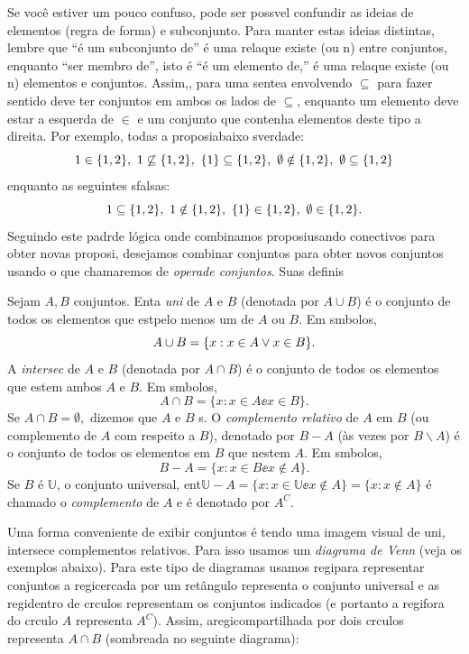 Se voc\^e estiver um pouco confuso, pode ser poss\ih vel confundir as ideias de elementos (regra de forma\caoi) e subconjunto. Para manter estas ideias distintas, lembre que ``\'e um subconjunto de'' \'e uma rela\cao que existe (ou n\aoi) entre conjuntos, enquanto ``ser membro de'', isto \'e ``\'e um elemento de,'' \'e uma rela\cao que existe (ou n\aoi) elementos e conjuntos. Assim,, para uma sente\cc a envolvendo $\subseteq$ para fazer sentido deve ter conjuntos em ambos os lados de $\subseteq$, enquanto um elemento deve estar a esquerda de $\in$ e um conjunto que contenha elementos deste tipo a direita. Por exemplo, todas a proposi\coes abaixo s\ao verdade:
\[
1\in\{1,2\},\textrm{ } 1\not\subseteq\{1,2\},\textrm{ } \{1\}\subseteq\{1,2\},\textrm{ } \emptyset\notin\{1,2\},\textrm{ } \emptyset\subseteq\{1,2\}  
\]  
enquanto as seguintes s\ao falsas:
\[
1\subseteq\{1,2\},\textrm{ } 1\notin\{1,2\},\textrm{ } \{1\}\in\{1,2\},\textrm{ } \emptyset\in \{1,2\}.
\]
Seguindo este padr\ao de l\'ogica onde combinamos proposi\coes usando conectivos para obter novas proposi\cois, desejamos combinar conjuntos para obter novos conjuntos usando o que chamaremos de {\it opera\coes de conjuntos}. Suas defini\coes s\ao

\begin{definb}
Sejam $A,B$ conjuntos. Ent\ao a {\it uni\ao} de $A$ e $B$ (denotada por $A\cup B$) \'e o conjunto de todos os elementos que est\ao pelo menos um de $A$ ou $B$. Em s\ih mbolos, 
\[
A \cup B = \{x:x\in A \vee x\in B\}. 
\]
A {\it intersec\cao} de $A$ e $B$ (denotada por $A\cap B$) \'e o conjunto de todos os elementos que est\ao em ambos $A$ e $B$. Em s\ih mbolos, 
\[
A \cap B = \{x:x\in A \ee x\in B\}. 
\]
Se $A\cap B=\emptyset,$ dizemos que $A$ e $B$ s. O {\it complemento relativo} de $A$ em $B$ (ou complemento de $A$ com respeito a $B$), denotado por $B-A$ (\`as vezes por $B \backslash A$) \'e o conjunto de todos os elementos em $B$ que n\ao est\ao em $A$. Em s\ih mbolos,
\[
B-A = \{x:x\in B \ee x\notin A\}. 
\]
Se $B$ \'e $\mathbb{U}$, o conjunto universal, ent\ao $\mathbb{U}-A = \{x:x\in \mathbb{U} \ee x\notin A\}=\{x:x\notin A\}$ \'e chamado o {\it complemento} de $A$ e \'e denotado por $A^{C}$.
\end{definb}

Uma forma conveniente de exibir conjuntos \'e tendo uma imagem visual de uni\ois, intersec\coes e complementos relativos. Para isso usamos um {\it diagrama de Venn} (veja os exemplos abaixo). Para este tipo de diagramas usamos regi\oes para representar conjuntos a regi\ao cercada por um ret\^angulo representa o conjunto universal e as regi\oes dentro de c\ih rculos representam os conjuntos indicados (e portanto a regi\ao fora do c\ih rculo $A$ representa $A^C$). Assim, aregi\ao compartilhada por dois c\ih rculos representa $A\cap B$ (sombreada no seguinte diagrama):

